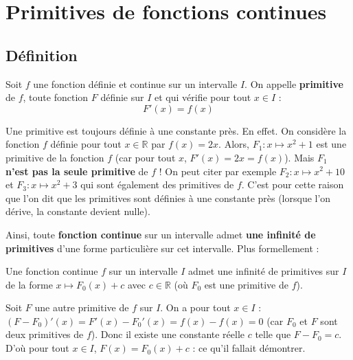 



	\section{Primitives de fonctions continues}

	\subsection{Définition}

	\begin{formula}[Définition]
		Soit $f$ une fonction définie et continue sur un intervalle $I$. On appelle \textbf{primitive} de $f$, toute fonction $F$ définie sur $I$ et qui vérifie pour tout $x \in I$ :
		\[ F'(x) = f(x) \]
	\end{formula}

	\begin{tip}[Note]
		Une primitive est toujours définie à une constante près.
		\newpar
		En effet. On considère la fonction $f$ définie pour tout $x \in \mathbb{R}$ par $f(x) = 2x$. Alors, $F_{1} : x \mapsto x^2 + 1$ est une primitive de la fonction $f$ (car pour tout $x$, $F'(x) = 2x = f(x)$).
		\newpar
		Mais $F_{1}$ \textbf{n'est pas la seule primitive} de $f$ ! On peut citer par exemple $F_{2} : x \mapsto x^2 + 10$ et $F_{3} : x \mapsto x^2 + 3$ qui sont également des primitives de $f$.
		\newpar
		C'est pour cette raison que l'on dit que les primitives sont définies à une constante près (lorsque l'on dérive, la constante devient nulle).
	\end{tip}

	Ainsi, toute \textbf{fonction continue} sur un intervalle admet \textbf{une infinité de primitives} d'une forme particulière sur cet intervalle. Plus formellement :

	\begin{formula}
		Une fonction continue $f$ sur un intervalle $I$ admet une infinité de primitives sur $I$ de la forme $x \mapsto F_0(x) + c$ avec $c \in \mathbb{R}$ (où $F_0$ est une primitive de $f$).
	\end{formula}

	\begin{demonstration}
		Soit $F$ une autre primitive de $f$ sur $I$. On a pour tout $x \in I$ :
		\newpar
		$(F - F_0)'(x) = F'(x) - F_0'(x) = f(x) - f(x) = 0$ (car $F_0$ et $F$ sont deux primitives de $f$).
		\newpar
		Donc il existe une constante réelle $c$ telle que $F - F_0 = c$. D'où pour tout $x \in I$, $F(x) = F_0(x) + c$ : ce qu'il fallait démontrer.
	\end{demonstration}

